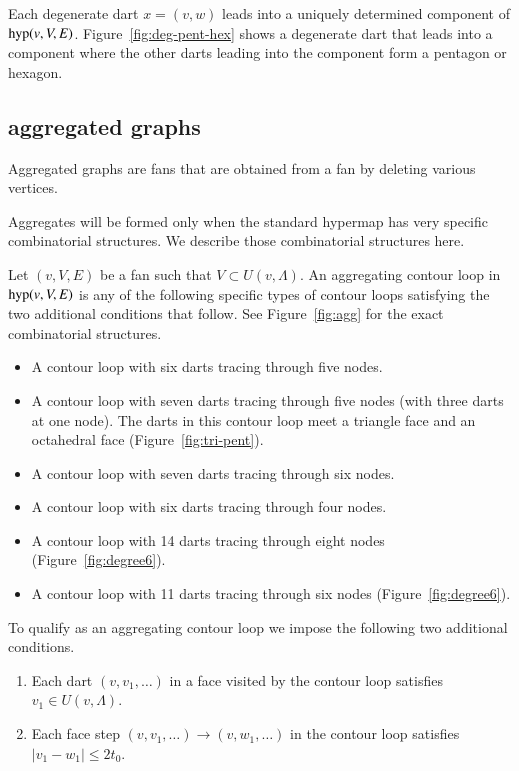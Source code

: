 Each degenerate dart $x=(v,w)$ leads into a uniquely determined
component of ${\operatorname{hyp}}(v,V,E)$.  
Figure~\ref{fig:deg-pent-hex} %
shows a degenerate dart that leads into a component where
the other darts leading into the component form a pentagon
or hexagon.


\subsection{aggregated graphs}
\label{sec:stargraph}


Aggregated graphs are fans that are obtained from
a fan by deleting various vertices.  

Aggregates will be formed only when the standard hypermap has
very specific combinatorial structures.  We describe those
combinatorial structures here.

\begin{definition}
Let $(v,V,E)$ be a fan such that $V\subset U(v,\Lambda)$.
An aggregating contour loop in ${\operatorname{hyp}}(v,V,E)$ 
is any of the following specific
types of contour loops satisfying the 
two additional conditions that follow.
See Figure~\ref{fig:agg} %
for the exact combinatorial structures.
\begin{itemize}
\item A contour loop with six darts tracing through five nodes. 
\item A contour loop with seven darts tracing through five nodes (with three
  darts at one node).
   The darts in this contour loop
   meet a triangle face and an octahedral face (Figure~\ref{fig:tri-pent}). 
\item A contour loop with seven darts tracing through six nodes.
\item A contour loop with six darts tracing through four nodes. 
\item A contour loop with 14 darts tracing through eight nodes
   (Figure~\ref{fig:degree6}). %
\item A contour loop with 11 darts tracing through six nodes %
   (Figure~\ref{fig:degree6}).
\end{itemize}
To qualify as an aggregating 
contour loop we impose the following two additional conditions.
\begin{enumerate}
\item Each dart $(v,v_1,\ldots)$ in a face visited by the contour 
loop satisfies $v_1\in U(v,\Lambda)$.
\item Each face step $(v,v_1,\ldots)\to (v,w_1,\ldots)$ in the contour
loop satisfies $|v_1-w_1|\le 2t_0$.
\end{enumerate}
\end{definition}

